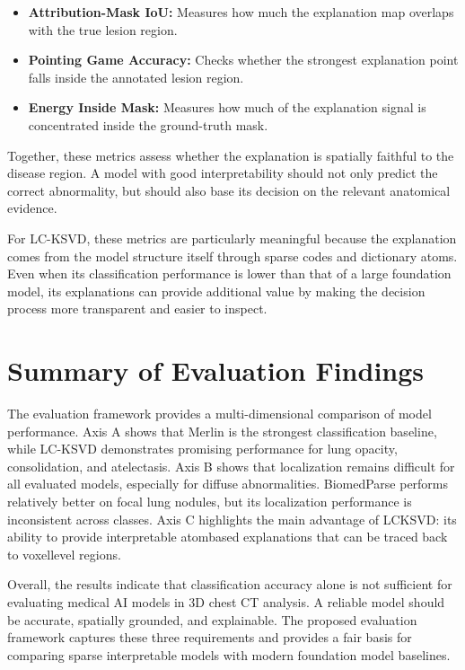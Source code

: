 \begin{itemize}
    \item \textbf{Attribution-Mask IoU:} Measures how much the explanation map overlaps with the true lesion region.
    
    \item \textbf{Pointing Game Accuracy:} Checks whether the strongest explanation point falls inside the annotated lesion region.
    
    \item \textbf{Energy Inside Mask:} Measures how much of the explanation signal is concentrated inside the ground-truth mask.
\end{itemize}

Together, these metrics assess whether the explanation is spatially faithful to the disease region. A model with good interpretability should not only predict the correct abnormality, but should also base its decision on the relevant anatomical evidence.

For LC-KSVD, these metrics are particularly meaningful because the explanation comes from the model structure itself through sparse codes and dictionary atoms. Even when its classification performance is lower than that of a large foundation model, its explanations can provide additional value by making the decision process more transparent and easier to inspect.

\section{Summary of Evaluation Findings}

The evaluation framework provides a multi-dimensional comparison of model performance. Axis A shows that Merlin is the strongest classification baseline, while LC-KSVD demonstrates promising performance for lung opacity, consolidation, and atelectasis. Axis B shows that localization remains difficult for all evaluated models, especially for diffuse abnormalities. BiomedParse performs relatively better on focal lung nodules, but its localization performance is inconsistent across classes. Axis C highlights the main advantage of LCKSVD: its ability to provide interpretable atombased explanations that can be traced back to voxellevel regions.

Overall, the results indicate that classification accuracy alone is not sufficient for evaluating medical AI models in 3D chest CT analysis. A reliable model should be accurate, spatially grounded, and explainable. The proposed evaluation framework captures these three requirements and provides a fair basis for comparing sparse interpretable models with modern foundation model baselines.
